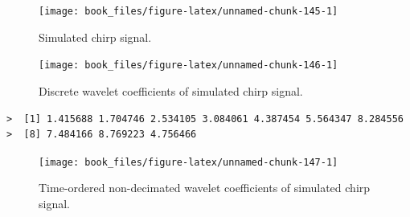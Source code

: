 \documentclass[b5paper,]{scrbook}
\makeatletter
\newenvironment{Shaded}{\begin{snugshade}}{\end{snugshade}}
\newcommand{\KeywordTok}[1]{\textcolor[rgb]{0.13,0.29,0.53}{\textbf{{#1}}}}
\newcommand{\DataTypeTok}[1]{\textcolor[rgb]{0.13,0.29,0.53}{{#1}}}
\newcommand{\DecValTok}[1]{\textcolor[rgb]{0.00,0.00,0.81}{{#1}}}
\newcommand{\StringTok}[1]{\textcolor[rgb]{0.31,0.60,0.02}{{#1}}}
\newcommand{\NormalTok}[1]{{#1}}
\theoremstyle{plain}
\theoremstyle{definition}
\numberwithin{equation}{section}
\newenvironment{kframe}{%
\medskip{}
\setlength{\fboxsep}{.8em}
 \def\at@end@of@kframe{}%
 \ifinner\ifhmode%
  \def\at@end@of@kframe{\end{minipage}}%
  \begin{minipage}{\columnwidth}%
 \fi\fi%
 \def\FrameCommand##1{\hskip\@totalleftmargin \hskip-\fboxsep
 \colorbox{shadecolor}{##1}\hskip-\fboxsep
     \hskip-\linewidth \hskip-\@totalleftmargin \hskip\columnwidth}%
 \MakeFramed {\advance\hsize-\width
   \@totalleftmargin\z@ \linewidth\hsize
   \@setminipage}}%
 {\par\unskip\endMakeFramed%
 \at@end@of@kframe}
\renewenvironment{Shaded}{\begin{kframe}}{\end{kframe}}
\makeatother
\begin{document}
\begin{figure}

{\centering \texttt{[image: book\_files/figure-latex/unnamed-chunk-145-1]} 

}

\caption{Simulated chirp signal.}\label{fig:unnamed-chunk-145}
\end{figure}

\begin{Shaded}
\end{Shaded}

\begin{figure}

{\centering \texttt{[image: book\_files/figure-latex/unnamed-chunk-146-1]} 

}

\caption{Discrete wavelet coefficients of simulated chirp signal.}\label{fig:unnamed-chunk-146}
\end{figure}

\begin{verbatim}
>  [1] 1.415688 1.704746 2.534105 3.084061 4.387454 5.564347 8.284556
>  [8] 7.484166 8.769223 4.756466
\end{verbatim}

\begin{Shaded}
\end{Shaded}

\begin{figure}

{\centering \texttt{[image: book\_files/figure-latex/unnamed-chunk-147-1]} 

}

\caption{Time-ordered non-decimated wavelet coefficients of simulated chirp signal.}\label{fig:unnamed-chunk-147}
\end{figure}
\end{document}
